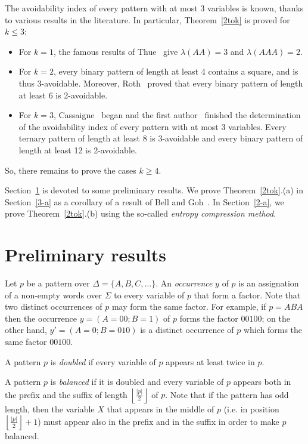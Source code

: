 \documentclass[]{elsart}
\def\floor#1{\left\lfloor #1 \right\rfloor}
\newcommand{\set}[1]{\{#1\}}
\newcounter{example}
\begin{document}
The avoidability index of every pattern with at most 3 variables is
known, thanks to various results in the literature. In particular,
Theorem~\ref{2tok} is proved for $k\le 3$:
\begin{itemize}
\item For $k=1$, the famous results of Thue~\cite{Thue06,Thue12} give
$\lambda(AA)=3$ and $\lambda(AAA)=2$.
\item For $k=2$, every binary pattern of length at least 4 contains a
square, and is thus 3-avoidable. Moreover, Roth~\cite{Roth:1992}
proved that every binary pattern of length at least 6 is 2-avoidable.
\item For $k=3$, Cassaigne~\cite{Cassaigne:1994} began and the first
author~\cite{Ochem:2004} finished the determination of the
avoidability index of every pattern with at most 3 variables. Every
ternary pattern of length at least 8 is 3-avoidable and every binary
pattern of length at least 12 is 2-avoidable.
\end{itemize}

So, there remains to prove the cases $k\ge 4$.


Section~\ref{sec:preliminary} is devoted to some preliminary results.
We prove Theorem~\ref{2tok}.(a) in Section~\ref{3-a} as a corollary of
a result of Bell and Goh~\cite{BellGoh:2007}. In Section~\ref{2-a}, we
prove Theorem~\ref{2tok}.(b) using the so-called \emph{entropy compression method}.

\section{Preliminary results}\label{sec:preliminary}

Let $p$ be a pattern over $\Delta=\set{A,B,C,\ldots}$. An
\emph{occurrence} $y$ of $p$ is an assignation of a non-empty words
over $\Sigma$ to every variable of $p$ that form a factor. Note that
two distinct occurrences of $p$ may form the same factor. For example,
if $p=ABA$ then the occurrence $y=(A=00; B=1)$ of $p$ forms the factor
$00100$; on the other hand, $y'=(A=0; B=010)$ is a distinct occurrence
of $p$ which forms the same factor $00100$.

A pattern $p$ is \emph{doubled} if every variable of $p$ appears at least twice in $p$.

A pattern $p$ is \emph{balanced} if it is doubled and every variable
of $p$ appears both in the prefix and the suffix of length
$\floor{\frac{|p|}{2}}$ of $p$. Note that if the pattern has odd
length, then the variable $X$ that appears in the middle of $p$ (i.e. in
position $\floor{\frac{|p|}{2}} + 1$) must appear also in the prefix
and in the suffix in order to make $p$ balanced.
\end{document}
